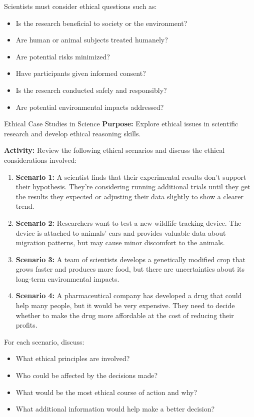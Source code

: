 Scientists must consider ethical questions such as:
\begin{itemize}
    \item Is the research beneficial to society or the environment?
    \item Are human or animal subjects treated humanely?
    \item Are potential risks minimized?
    \item Have participants given informed consent?
    \item Is the research conducted safely and responsibly?
    \item Are potential environmental impacts addressed?
\end{itemize}

\begin{investigation}{Ethical Case Studies in Science}
\textbf{Purpose:} Explore ethical issues in scientific research and develop ethical reasoning skills.

\textbf{Activity:} Review the following ethical scenarios and discuss the ethical considerations involved:

\begin{enumerate}
    \item \textbf{Scenario 1:} A scientist finds that their experimental results don't support their hypothesis. They're considering running additional trials until they get the results they expected or adjusting their data slightly to show a clearer trend.
    
    \item \textbf{Scenario 2:} Researchers want to test a new wildlife tracking device. The device is attached to animals' ears and provides valuable data about migration patterns, but may cause minor discomfort to the animals.
    
    \item \textbf{Scenario 3:} A team of scientists develops a genetically modified crop that grows faster and produces more food, but there are uncertainties about its long-term environmental impacts.
    
    \item \textbf{Scenario 4:} A pharmaceutical company has developed a drug that could help many people, but it would be very expensive. They need to decide whether to make the drug more affordable at the cost of reducing their profits.
\end{enumerate}

For each scenario, discuss:
\begin{itemize}
    \item What ethical principles are involved?
    \item Who could be affected by the decisions made?
    \item What would be the most ethical course of action and why?
    \item What additional information would help make a better decision?
\end{itemize}
\end{investigation}

